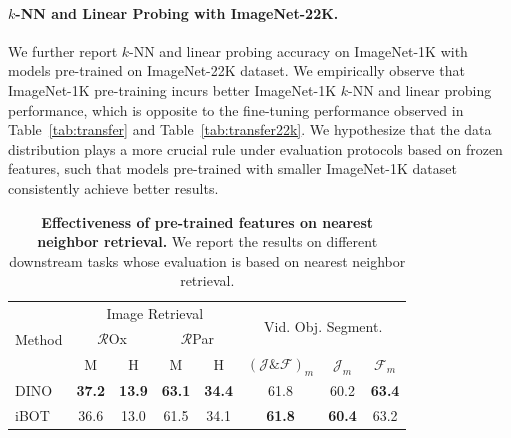 \documentclass{article} %
\def\ourmethod{{iBOT}\xspace}
\begin{document}
\begin{table}[!tbp]
\captionsetup{width=0.98\linewidth}
\caption{\textbf{$k$-NN and linear probing on ImageNet-1K with different pre-training datasets}.}
\label{tab:linear22k}
\vspace{-0.2cm}
\centering
{}
\end{table}

\paragraph{$k$-NN and Linear Probing with ImageNet-22K.} 
We further report $k$-NN and linear probing accuracy on ImageNet-1K with models pre-trained on ImageNet-22K dataset. We empirically observe that ImageNet-1K pre-training incurs better ImageNet-1K $k$-NN and linear probing performance, which is opposite to the fine-tuning performance observed in Table~\ref{tab:transfer} and Table~\ref{tab:transfer22k}. We hypothesize that the data distribution plays a more crucial rule under evaluation protocols based on frozen features, such that models pre-trained with smaller ImageNet-1K dataset consistently achieve better results.

\begin{table}[!tbp]
\caption{\textbf{Effectiveness of pre-trained features on nearest neighbor retrieval.} We report the results on different downstream tasks whose evaluation is based on nearest neighbor retrieval.}
\label{tab:retrival}
\vspace{-0.2cm}
\centering
\begin{tabular}{lccccccc}
\multirow{3}{*}{Method} & \multicolumn{4}{c}{Image Retrieval} & 
\multicolumn{3}{c}{\multirow{2}{*}{Vid. Obj. Segment.}}\\
& \multicolumn{2}{c}{$\mathcal{R}$Ox} & \multicolumn{2}{c}{$\mathcal{R}$Par}\\
\cmidrule(lr){2-5}\cmidrule(lr){6-8}
& M & H & M & H & $(\mathcal{J}\&\mathcal{F})_m$ & $\mathcal{J}_m$ & $\mathcal{F}_m$  \\
\toprule
DINO & \bf 37.2 & \bf 13.9 & \bf 63.1 & \bf 34.4 & 61.8 & 60.2 & \bf 63.4 \\
\rowcolor{cyan!50}
\ourmethod & 36.6 & 13.0 & 61.5 & 34.1 & \bf 61.8 & \bf 60.4 & 63.2 \\
\bottomrule
\end{tabular}
\end{table}
\end{document}
